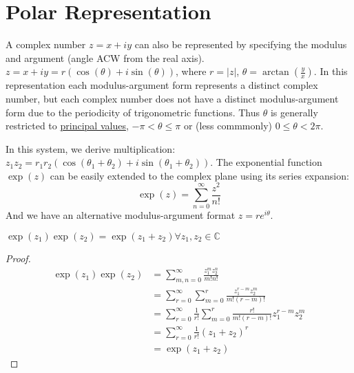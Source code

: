 \documentclass[../Main.tex]{subfiles}
\begin{document}
\section{Polar Representation}
A complex number $z = x + i y$ can also be represented by specifying the modulus and argument (angle ACW from the real axis). $z = x + i y = r(\cos(\theta) + i\sin(\theta))$, where $r = |z|$, $\theta = \arctan(\frac{y}{x})$. In this representation each modulus-argument form represents a distinct complex number, but each complex number does not have a distinct modulus-argument form due to the periodicity of trigonometric functions. Thus $\theta$ is generally restricted to \underline{principal values}, $-\pi < \theta \leq \pi$ or (less commmonly) $0 \leq \theta < 2\pi$.\par
In this system, we derive multiplication: $z_1 z_2 = r_1 r_2 (\cos(\theta_1 + \theta_2) + i\sin(\theta_1 + \theta_2))$.
The exponential function $\exp(z)$ can be easily extended to the complex plane using its series expansion:
\begin{equation*}
    \exp(z) = \sum_{n=0}^{\infty}{\frac{z^2}{n!}}
\end{equation*}
And we have an alternative modulus-argument format $z = re^{i\theta}$.
\begin{proposition}
    $\exp(z_1)\exp(z_2) = \exp(z_1 + z_2) \forall z_1, z_2 \in \mathbb{C}$
\end{proposition}
\begin{proof}
    \begin{align*}
        \exp(z_1)\exp(z_2) &= \sum_{m, n = 0}^{\infty}\frac{z_1^m z_2^n}{m!n!} \\
        &=\sum_{r=0}^{\infty}\sum_{m=0}^{r}\frac{z_1^{r-m}z_2^m}{m!(r-m)!} \\
        &=\sum_{r=0}^{\infty}\frac{1}{r!}\sum_{m=0}^{r}\frac{r!}{m!(r-m)!}z_1^{r-m}z_2^m \\
        &=\sum_{r=0}^{\infty}\frac{1}{r!}\left(z_1 + z_2\right)^r \\
        &=\exp(z_1 + z_2)
    \end{align*}
\end{proof}
\end{document}
